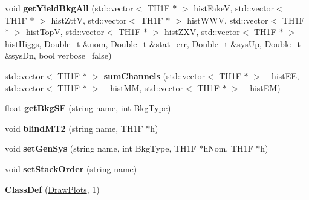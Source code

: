 \begin{DoxyCompactItemize}
\item 
\hypertarget{classDrawPlots_aa2a51e0cc5fc724f37b3867bdff48a7d}{
void {\bfseries getYieldBkgAll} (std::vector$<$ TH1F $\ast$ $>$ histFakeV, std::vector$<$ TH1F $\ast$ $>$ histZttV, std::vector$<$ TH1F $\ast$ $>$ histWWV, std::vector$<$ TH1F $\ast$ $>$ histTopV, std::vector$<$ TH1F $\ast$ $>$ histZXV, std::vector$<$ TH1F $\ast$ $>$ histHiggs, Double\_\-t \&nom, Double\_\-t \&stat\_\-err, Double\_\-t \&sysUp, Double\_\-t \&sysDn, bool verbose=false)}
\label{classDrawPlots_aa2a51e0cc5fc724f37b3867bdff48a7d}

\item 
\hypertarget{classDrawPlots_a3cf3dddd96ea9082af2871dfed0a5db5}{
std::vector$<$ TH1F $\ast$ $>$ {\bfseries sumChannels} (std::vector$<$ TH1F $\ast$ $>$ \_\-histEE, std::vector$<$ TH1F $\ast$ $>$ \_\-histMM, std::vector$<$ TH1F $\ast$ $>$ \_\-histEM)}
\label{classDrawPlots_a3cf3dddd96ea9082af2871dfed0a5db5}

\item 
\hypertarget{classDrawPlots_a423c1d88b1c8a94cae37dda5072a23cc}{
float {\bfseries getBkgSF} (string name, int BkgType)}
\label{classDrawPlots_a423c1d88b1c8a94cae37dda5072a23cc}

\item 
\hypertarget{classDrawPlots_a04df81ced03e3e975c51763d1553850a}{
void {\bfseries blindMT2} (string name, TH1F $\ast$h)}
\label{classDrawPlots_a04df81ced03e3e975c51763d1553850a}

\item 
\hypertarget{classDrawPlots_ad1bb94df7182fa15852a0d8083e0bd65}{
void {\bfseries setGenSys} (string name, int BkgType, TH1F $\ast$hNom, TH1F $\ast$h)}
\label{classDrawPlots_ad1bb94df7182fa15852a0d8083e0bd65}

\item 
\hypertarget{classDrawPlots_a2c1edbfb7fab2c112a808825a472c87c}{
void {\bfseries setStackOrder} (string name)}
\label{classDrawPlots_a2c1edbfb7fab2c112a808825a472c87c}

\item 
\hypertarget{classDrawPlots_a929ee8f7c8b519b12345a4b97ffea51d}{
{\bfseries ClassDef} (\hyperlink{classDrawPlots}{DrawPlots}, 1)}
\label{classDrawPlots_a929ee8f7c8b519b12345a4b97ffea51d}

\end{DoxyCompactItemize}
